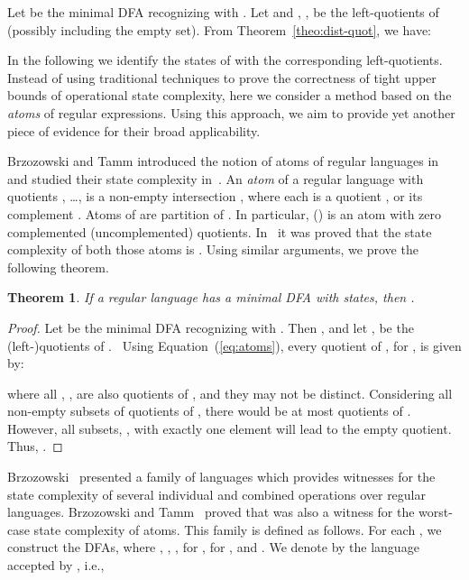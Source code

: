 \documentclass{article}
\newtheorem{theorem}{Theorem}
\newcommand{\dfa}{DFA\xspace}
\newcommand{\dfas}{DFAs\xspace}
\begin{document}
Let  be the minimal \dfa recognizing
 with . 
Let  and , , be the
left-quotients of  (possibly including the empty set). 
From  Theorem~\ref{theo:dist-quot}, we have:
  

In the following we identify the states of  with the
corresponding left-quotients. 
Instead of using traditional techniques to prove the correctness of 
tight upper bounds of operational state complexity, 
here we consider a method based on the \emph{atoms} 
of regular expressions. 
Using this approach, we  aim to provide yet another piece of evidence for their
 broad applicability.

Brzozowski and Tamm introduced
the notion of atoms of regular languages in~\cite{brzozowski11:_theor_of_atomat}
  and studied their state complexity in~\cite{brzozowski13:_compl_of_atoms_of_regul_languag}. 
An \emph{atom} of a regular language  with  quotients , \ldots,
 is a non-empty intersection ,
where each  is a quotient , or its complement
. Atoms of  are partition of  .
In particular,  
() is an atom with zero complemented 
(uncomplemented) quotients.
In~\cite{brzozowski13:_compl_of_atoms_of_regul_languag} it
was proved that the state complexity of both those atoms is . 
Using similar arguments, we prove the following theorem.

\begin{theorem}
  \label{theo:scdistub}
If a regular language  has a  minimal \dfa with  states, then
. 
\end{theorem}
\begin{proof}
  Let  be the minimal \dfa recognizing
   with . 
Then , and let ,  be the
  (left-)quotients of . 
\ Using Equation~(\ref{eq:atoms}), every quotient 
  of , for , is given by:

\noindent where all , , are also
quotients of , and they may not be distinct. 
Considering all non-empty subsets of quotients of , 
there would be at most  quotients of . 
However, all subsets, , with exactly one element 
will lead to the empty quotient.  Thus, . 
\end{proof}

Brzozowski~\cite{brzozowski13:_in_searc_of_most_compl_regul_languag}
presented a family of languages  which provides witnesses for the
state complexity of several individual and combined operations over
regular languages. Brzozowski and
Tamm~\cite{brzozowski13:_compl_of_atoms_of_regul_languag} proved that
 was also a witness for the worst-case state complexity of
atoms. This family is defined as follows. For each , 
we construct the \dfas , where  
, , ,
 for  
,  for , and . 
We denote by 
the language accepted by , i.e.,
\end{document}
